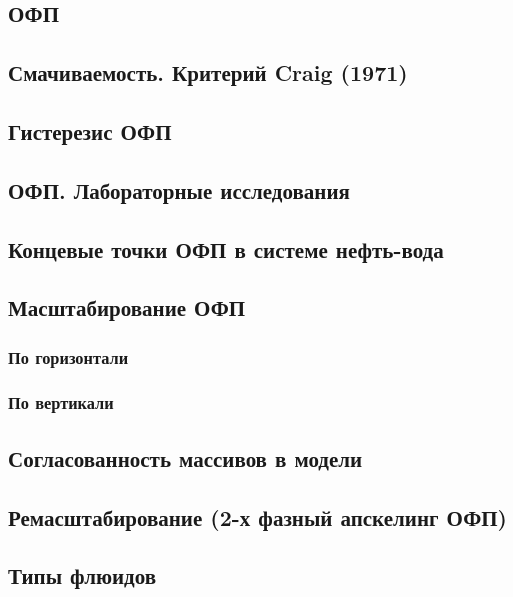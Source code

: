 \documentclass[main.tex]{subfiles}
\begin{document}
\subsection{ОФП}

\subsection{Смачиваемость. Критерий Craig (1971)}

\subsection{Гистерезис ОФП}

\subsection{ОФП. Лабораторные исследования}

\subsection{Концевые точки ОФП в системе нефть-вода}

\subsection{Масштабирование ОФП}

\subsubsection{По горизонтали}

\subsubsection{По вертикали}

\subsection{Согласованность массивов в модели}

\subsection{Ремасштабирование (2-х фазный апскелинг ОФП)}

\subsection{Типы флюидов}
\end{document}
